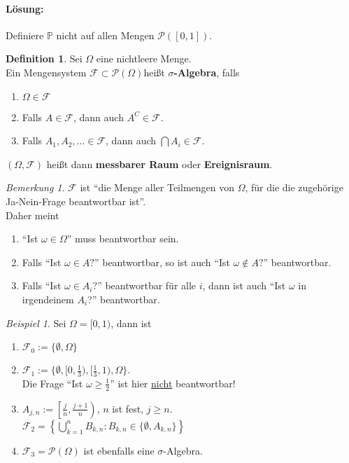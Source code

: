 \documentclass[10pt,a4paper]{article}
\newcommand{\potset}{\mathscr P}
\newcommand{\Prb}{\mathbb P}
\newcounter{thm}[section]
\theoremstyle{definition}
\newtheorem{definition}[thm]{Definition}
\theoremstyle{plain}
\theoremstyle{remark}
\newtheorem{bem}[thm]{Bemerkung}
\newtheorem{exm}[thm]{Beispiel}
\begin{document}
	\paragraph*{Lösung:} Definiere $\Prb$ nicht auf allen Mengen $\potset([0,1])$.
	
	\begin{definition}
		Sei $\Omega$ eine nichtleere Menge.\\
		Ein Mengensystem $\mathscr F\subset \potset(\Omega)$heißt \textbf{$\sigma$-Algebra}, falls
		\begin{enumerate}
			\item $\Omega\in\mathscr F$
			\item Falls $A\in\mathscr F$, dann auch $A^C\in\mathscr F$.
			\item Falls $A_1,A_2,...\in\mathscr F$, dann auch $\bigcap A_i\in\mathscr F$.
		\end{enumerate}
	$(\Omega,\mathscr F)$ heißt dann \textbf{messbarer Raum} oder \textbf{Ereignisraum}.
	\end{definition}

	\begin{bem}
		$\mathscr F$ ist ``die Menge aller Teilmengen von $\Omega$, für die die zugehörige Ja-Nein-Frage beantwortbar ist''.\\
		Daher meint
		\begin{enumerate}
			\item ``Ist $\omega\in\Omega$'' muss beantwortbar sein.
			\item Falls ``Ist $\omega\in A?$'' beantwortbar, so ist auch ``Ist $\omega\notin A?$'' beantwortbar.
			\item Falls ``Ist $\omega\in A_i?$'' beantwortbar für alle $i$, dann ist auch ``Ist $\omega$ in irgendeinem $A_i$?'' beantwortbar.
		\end{enumerate}
	\end{bem}

	\begin{exm}
		Sei $\Omega=[0,1)$, dann ist \begin{enumerate}
			\item $\mathscr F_0:=\{\emptyset,\Omega\}$
			\item $\mathscr F_1:=\{\emptyset,[0,\frac{1}{3}),[\frac{1}{3},1),\Omega\}$.\\
			Die Frage ``Ist $\omega\ge \frac{1}{2}$'' ist hier \underline{nicht} beantwortbar!
			\item $A_{j,n}:=\left[\frac{j}{n},\frac{j+1}{n}\right)$, $n$ ist fest, $j\ge n$.\\
			$\mathscr F_2=\left\{\bigcup_{k=1}^{n}B_{k,n}:B_{k,n}\in\{\emptyset,A_{k,n}\}\right\}$
			\item $\mathscr F_3=\potset(\Omega)$ ist ebenfalls eine $\sigma$-Algebra.
		\end{enumerate}
	\end{exm}
	
\end{document}
